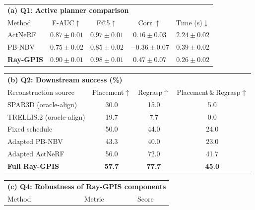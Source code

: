 \documentclass[conference]{IEEEtran}
\begin{document}
\begin{table}[t]
\centering
{}
\label{tab:main}
\vspace{-0.08cm}
\footnotesize
\setlength{\tabcolsep}{3pt}
\renewcommand{\arraystretch}{0.95}

\begin{tabularx}{\linewidth}{Xcccc}
\toprule
\multicolumn{5}{l}{\textbf{(a) Q1: Active planner comparison}} \\
Method
& F-AUC$\uparrow$
& F@5$\uparrow$
& Corr.$\uparrow$
& Time (s)$\downarrow$ \\
\midrule
ActNeRF~\cite{actnerf}
& $0.87{\pm}0.01$
& $0.97{\pm}0.01$
& $0.16{\pm}0.03$
& $2.24{\pm}0.02$ \\

PB-NBV~\cite{pbnbv}
& $0.75{\pm}0.02$
& $0.85{\pm}0.02$
& $-0.36{\pm}0.07$
& $0.39{\pm}0.02$ \\

\textbf{Ray-GPIS}
& $\mathbf{0.90{\pm}0.01}$
& $\mathbf{0.98{\pm}0.01}$
& $\mathbf{0.47{\pm}0.07}$
& $\mathbf{0.26{\pm}0.02}$ \\
\bottomrule
\end{tabularx}
\vspace{0.06cm}
\begin{tabularx}{\linewidth}{Xccc}
\toprule
\multicolumn{4}{l}{\textbf{(b) Q2: Downstream success (\%)}} \\
Reconstruction source
  & Placement$\uparrow$
  & Regrasp$\uparrow$
  & Placement\,\&\,Regrasp$\uparrow$ \\
\midrule
SPAR3D (oracle-align)
  & 30.0 & 15.0 & 5.0 \\
TRELLIS.2 (oracle-align)
  & 19.7 & 7.7 & 0.0 \\
Fixed schedule
  & 50.0 & 44.0 & 24.0 \\
Adapted PB-NBV
  & 43.3 & 40.0 & 23.0 \\
Adapted ActNeRF
  & 56.0 & 72.0 & 41.7 \\
\textbf{Full Ray-GPIS}
  & \textbf{57.7}
  & \textbf{77.7}
  & \textbf{45.0} \\

\bottomrule
\end{tabularx}
\vspace{0.06cm}
\begin{tabularx}{\linewidth}{Xcc}
\toprule
\multicolumn{3}{l}{\textbf{(c) Q4: Robustness of Ray-GPIS components}} \\
Method & Metric & Score \\
\midrule


\end{tabularx}
\end{table}
\end{document}
